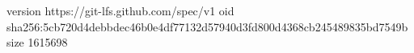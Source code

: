 version https://git-lfs.github.com/spec/v1
oid sha256:5cb720d4debbdec46b0e4df77132d57940d3fd800d4368cb245489835bd7549b
size 1615698
